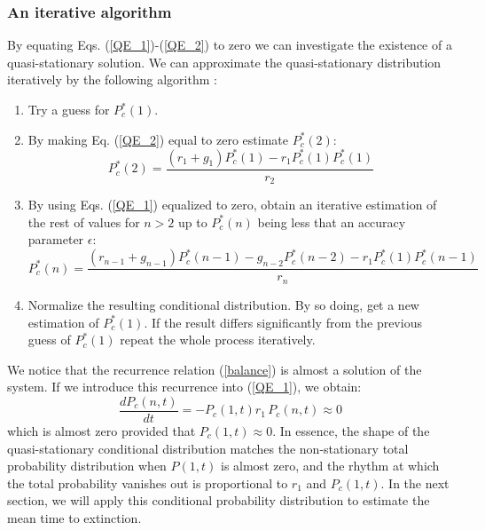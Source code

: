 \subsubsection{An iterative algorithm}
By equating Eqs. (\ref{QE_1})-(\ref{QE_2}) to zero we can investigate the existence of a quasi-stationary solution. We can approximate the quasi-stationary distribution iteratively by the following algorithm \cite{Nisbet82}:
\begin{enumerate}
\item Try a guess for $P^*_c(1)$.
\item By making Eq. (\ref{QE_2}) equal to zero estimate $P^*_c(2)$:
  \begin{equation}
    P^*_c(2) = \frac{(r_1+g_1)P^*_c(1) - r_1 P^*_c(1) P^*_c(1)}{r_2}
  \end{equation}
\item By using Eqs. (\ref{QE_1}) equalized to zero, obtain an iterative estimation of the 
rest of values for $n>2$ up to $P^*_c(n)$ being less that an accuracy parameter $\epsilon$:
  \begin{equation}
    P^*_c(n) = \frac{(r_{n-1}+g_{n-1})P^*_c(n-1) - g_{n-2} P^*_c(n-2) - r_1 P^*_c(1) P^*_c(n-1)}{r_n}
  \end{equation}
\item Normalize the resulting conditional distribution. By so doing, get a new estimation 
of $P^*_c(1)$. If the result differs significantly from the previous guess of $P^*_c(1)$ 
repeat the whole process iteratively.
\end{enumerate}

We notice that the recurrence relation (\ref{balance}) is almost a solution of the system. If we introduce this recurrence into (\ref{QE_1}), we obtain:
\begin{equation}
  \label{QE_3}
  \frac{dP_c(n,t)}{dt} =  - P_c(1,t)r_1\,P_c(n,t) \approx 0
\end{equation}
which is almost zero provided that $P_c(1,t) \approx 0$. In essence, the shape of the quasi-stationary conditional distribution matches the non-stationary total probability distribution when $P(1,t)$ is almost zero, and the rhythm at which the total probability vanishes out is proportional to $r_1$ and $P_c(1,t)$. In the next section, we will apply this conditional probability distribution to estimate the mean time to extinction.

